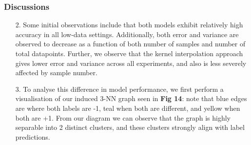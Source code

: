 \documentclass[12pt]{article}
\begin{document}
\subsubsection{Discussions}
\begin{itemize}
    \item[2.]
        Some initial observations include that both models exhibit relatively high accuracy in all low-data settings. Additionally, both error and variance are observed to decrease as a function of both number of samples and number of total datapoints.
        Further, we observe that the kernel interpolation approach gives lower error and variance across all experiments, and also is less severely affected by sample number.
    \item[3.]
        To analyse this difference in model performance, we first perform a visualisation of our induced 3-NN graph seen in \textbf{Fig 14}: note that blue edges are where both labels are -1, teal when both are different, and yellow when both are +1.
        From our diagram we can observe that the graph is highly separable into 2 distinct clusters, and these clusters strongly align with label predictions. 


\end{itemize}
\end{document}
